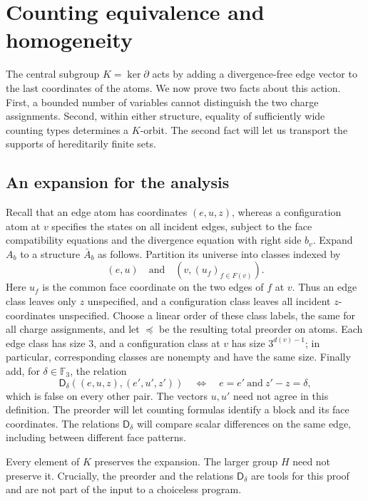 \section{Counting equivalence and homogeneity}
\label{sec:base-counting}

The central subgroup \(K=\ker\partial\) acts by adding a divergence-free
edge vector to the last coordinates of the atoms.  We now prove two facts
about this action.  First, a bounded number of variables cannot distinguish
the two charge assignments.  Second, within either structure, equality of
sufficiently wide counting types determines a \(K\)-orbit.  The second fact
will let us transport the supports of hereditarily finite sets.

\subsection{An expansion for the analysis}

Recall that an edge atom has coordinates \((e,u,z)\), whereas a configuration
atom at \(v\) specifies the states on all incident edges, subject to the face
compatibility equations and the divergence equation with right side \(b_v\).
Expand \(A_b\) to a structure \(\bar A_b\) as follows.  Partition its universe
into classes indexed by
\[
 (e,u)\quad\text{and}\quad(v,(u_f)_{f\in F(v)}).
\]
Here \(u_f\) is the common face coordinate on the two edges of \(f\) at
\(v\). Thus an edge class leaves only \(z\) unspecified, and a configuration
class leaves all incident \(z\)-coordinates unspecified.  Choose a linear order of
these class labels, the same for all charge assignments, and let
\(\preceq\) be the resulting total preorder on atoms.  Each edge class has
size \(3\), and a configuration class at \(v\) has size
\(3^{d(v)-1}\); in particular, corresponding classes are nonempty and have
the same size.  Finally add, for \(\delta\in\mathbb F_3\), the relation
\[
 \mathsf D_\delta((e,u,z),(e',u',z'))
 \quad\Longleftrightarrow\quad e=e'\ \text{and}\ z'-z=\delta,
\]
which is false on every other pair.  The vectors \(u,u'\) need not agree in
this definition. The preorder will let counting formulas identify a block
and its face coordinates. The relations \(\mathsf D_\delta\) will compare
scalar differences on the same edge, including between different face patterns.

Every element of \(K\) preserves the expansion.  The larger group \(H\)
need not preserve it.  Crucially, the preorder and the relations
\(\mathsf D_\delta\) are tools for this proof and are not part of the input
to a choiceless program.

